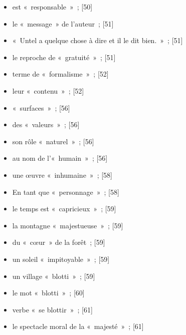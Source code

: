 \documentclass[12pt, a4paper]{article}
\begin{document}
\begin{itemize}
    \item est «~responsable~»{\color{gray}~; [50]}

    \item le «~message~» de l’auteur{\color{gray}~; [51]}

    \item «~Untel a quelque chose à dire et il le dit bien.~»{\color{gray}~; [51]}

    \item le reproche de «~gratuité~»{\color{gray}~; [51]}

    \item terme de «~formalisme~»{\color{gray}~; [52]}

    \item leur «~contenu~»{\color{gray}~; [52]}

    \item «~surfaces~»{\color{gray}~; [56]}

    \item des «~valeurs~»{\color{gray}~; [56]}

    \item son rôle «~naturel~»{\color{gray}~; [56]}

    \item au nom de l’«~humain~»{\color{gray}~; [56]}

    \item une œuvre «~inhumaine~»{\color{gray}~; [58]}

    \item En tant que «~personnage~»{\color{gray}~; [58]}

    \item le temps est «~capricieux~»{\color{gray}~; [59]}

    \item la montagne «~majestueuse~»{\color{gray}~; [59]}

    \item du «~cœur~» de la forêt{\color{gray}~; [59]}

    \item un soleil «~impitoyable~»{\color{gray}~; [59]}

    \item un village «~blotti~»{\color{gray}~; [59]}

    \item le mot «~blotti~»{\color{gray}~; [60]}

    \item verbe «~se blottir~»{\color{gray}~; [61]}

    \item le spectacle moral de la «~majesté~»{\color{gray}~; [61]}


\end{itemize}
\end{document}
